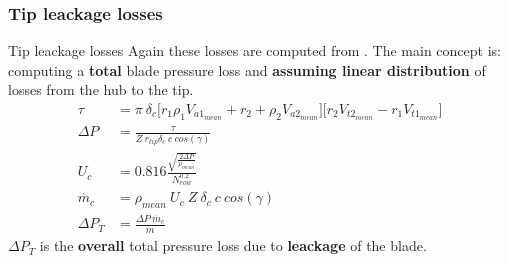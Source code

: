 \subsubsection{Tip leackage losses}
	{\nologo
	\begin{frame}{Tip leackage losses}
		Again these losses are computed from \cite[Sec. 6.9]{axial2004}. The main concept is: computing a \textbf{total} blade pressure loss and \textbf{assuming linear distribution} of losses from the hub to the tip. 
		\begin{align}
			\tau & = \pi \ \delta_c \Big[ r_1 \rho_1 V_{a1_{mean}} + r_2 + \rho_2 V_{a2_{mean}} \Big] \Big[ r_2 V_{t2_{mean}} - r_1 V_{t1_{mean}} \Big] \nonumber \\ 
			\Delta P & = \frac{\tau}{Z \ r_{tip} \delta_c \ c \ cos(\gamma)} \nonumber \\ 
			U_c & = 0.816 \frac{\sqrt{\frac{2 \Delta P}{\rho_{mean}}}}{N_{row}^{0.2}} \nonumber \\ 
			\dot{m_c} & = \rho_{mean} \ U_c \ Z \ \delta_c \ c \ cos(\gamma) \nonumber \\ 
			\Delta P_T & = \frac{\Delta P \ \dot{m_c}}{\dot{m}} \nonumber  
		\end{align}
		$\Delta P_T$ is the \textbf{overall} total pressure loss due to \textbf{leackage} of the blade.
	\end{frame}
	}
